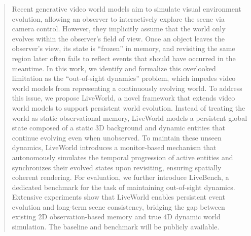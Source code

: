 \begin{abstract}
\vspace{-2mm}

Recent generative video world models aim to simulate visual environment evolution, allowing an observer to interactively explore the scene via camera control. However, they implicitly assume that the world only evolves within the observer's field of view. Once an object leaves the observer’s view, its state is ``frozen'' in memory, and revisiting the same region later often fails to reflect events that should have occurred in the meantime. In this work, we identify and formalize this overlooked limitation as the ``out-of-sight dynamics'' problem, which impedes video world models from representing a continuously evolving world. To address this issue, we propose LiveWorld, a novel framework that extends video world models to support persistent world evolution. Instead of treating the world as static observational memory, LiveWorld models a persistent global state composed of a static 3D background and dynamic entities that continue evolving even when unobserved. To maintain these unseen dynamics, LiveWorld introduces a monitor-based mechanism that autonomously simulates the temporal progression of active entities and synchronizes their evolved states upon revisiting, ensuring spatially coherent rendering. For evaluation, we further introduce LiveBench, a dedicated benchmark for the task of maintaining out-of-sight dynamics. Extensive experiments show that LiveWorld enables persistent event evolution and long-term scene consistency, bridging the gap between existing 2D observation-based memory and true 4D dynamic world simulation. 
The baseline and benchmark will be publicly available.

\vspace{-0.5mm}
\end{abstract}
